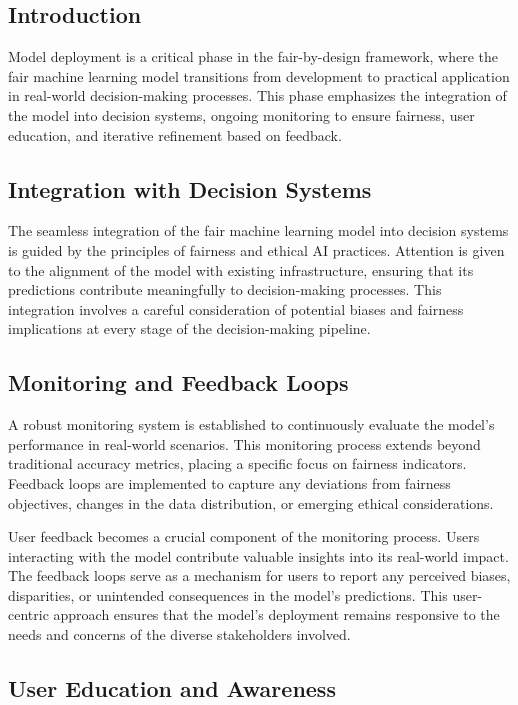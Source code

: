 \documentclass[12pt,a4paper,openright,twoside]{book}
\begin{document}
\subsection{Introduction}

Model deployment is a critical phase in the fair-by-design framework, where the fair machine learning model transitions from development to practical application in real-world decision-making processes. This phase emphasizes the integration of the model into decision systems, ongoing monitoring to ensure fairness, user education, and iterative refinement based on feedback.

\subsection{Integration with Decision Systems}

The seamless integration of the fair machine learning model into decision systems is guided by the principles of fairness and ethical AI practices. Attention is given to the alignment of the model with existing infrastructure, ensuring that its predictions contribute meaningfully to decision-making processes. This integration involves a careful consideration of potential biases and fairness implications at every stage of the decision-making pipeline.

\subsection{Monitoring and Feedback Loops}

A robust monitoring system is established to continuously evaluate the model's performance in real-world scenarios. This monitoring process extends beyond traditional accuracy metrics, placing a specific focus on fairness indicators. Feedback loops are implemented to capture any deviations from fairness objectives, changes in the data distribution, or emerging ethical considerations.

User feedback becomes a crucial component of the monitoring process. Users interacting with the model contribute valuable insights into its real-world impact. The feedback loops serve as a mechanism for users to report any perceived biases, disparities, or unintended consequences in the model's predictions. This user-centric approach ensures that the model's deployment remains responsive to the needs and concerns of the diverse stakeholders involved.

\subsection{User Education and Awareness}
\end{document}
